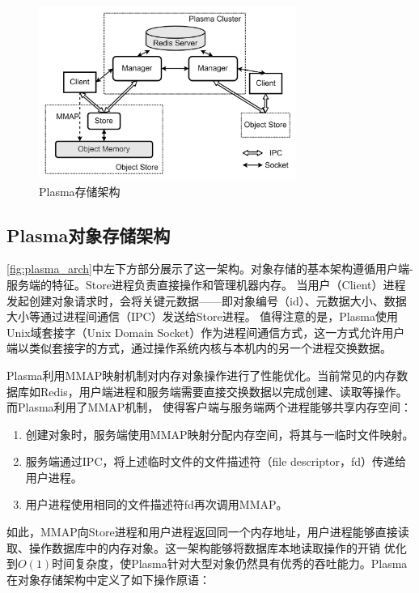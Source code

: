 \begin{figure}[h] 
    \centering
    \includegraphics[width=0.75\textwidth]{image/chap02/plasma_arch.png}
    \caption{Plasma存储架构}
    \label{fig:plasma_arch}
\end{figure}

\subsection{Plasma对象存储架构}

\autoref{fig:plasma_arch}中左下方部分展示了这一架构。对象存储的基本架构遵循用户端-服务端的特征。Store进程负责直接操作和管理机器内存。
当用户（Client）进程发起创建对象请求时，会将关键元数据——即对象编号（id）、元数据大小、数据大小等通过进程间通信（IPC）发送给Store进程。
值得注意的是，Plasma使用Unix域套接字（Unix Domain Socket）作为进程间通信方式，这一方式允许用户端以类似套接字的方式，通过操作系统内核与本机内的另一个进程交换数据。

Plasma利用MMAP映射机制对内存对象操作进行了性能优化。当前常见的内存数据库如Redis，用户端进程和服务端需要直接交换数据以完成创建、读取等操作。而Plasma利用了MMAP机制，
使得客户端与服务端两个进程能够共享内存空间：

\begin{enumerate}
    \item 创建对象时，服务端使用MMAP映射分配内存空间，将其与一临时文件映射。
    \item 服务端通过IPC，将上述临时文件的文件描述符（file descriptor，fd）传递给用户进程。
    \item 用户进程使用相同的文件描述符fd再次调用MMAP。
\end{enumerate}

如此，MMAP向Store进程和用户进程返回同一个内存地址，用户进程能够直接读取、操作数据库中的内存对象。这一架构能够将数据库本地读取操作的开销
优化到$O(1)$时间复杂度，使Plasma针对大型对象仍然具有优秀的吞吐能力。Plasma在对象存储架构中定义了如下操作原语：

